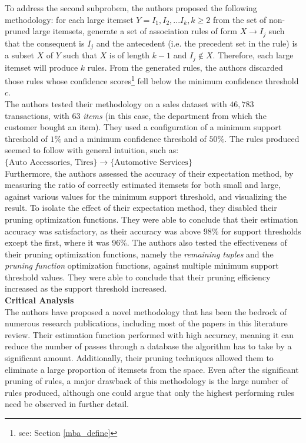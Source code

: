 \documentclass[paper=a4,fontsize=11pt]{report}	%
\begin{document}
To address the second subprobem,  the authors proposed the following methodology: for each large itemset $Y = I_1, I_2,...I_k, k\geq 2$ from the set of non-pruned large itemsets, generate a set of association rules of form $X \rightarrow I_j$ such that the consequent is $I_j$ and the antecedent (i.e. the precedent set in the rule) is a subset $X$ of $Y$ such that $X$ is of length $k-1$ and $I_j \notin X$. Therefore, each large itemset will produce $k$ rules. From the generated rules, the authors discarded those rules whose confidence scores\footnote{see: Section \ref{mba_define}} fell below the minimum confidence threshold $c$.\\
The authors tested their methodology on a sales dataset with $46,783$ transactions,  with $63$ \textit{items} (in this case, the department from which the customer bought an item). They used a configuration of a minimum support threshold of $1\%$ and a minimum confidence threshold of $50\%$. The rules produced seemed to follow with general intuition, such as:\\
$\{\text{Auto Accessories, Tires}\} \rightarrow \{\text{Automotive Services}\} $\\
Furthermore, the authors assessed the accuracy of their expectation method, by measuring the ratio of correctly estimated itemsets for both small and large, against various values for the minimum support threshold, and visualizing the result. To isolate the effect of their expectation method, they disabled their pruning optimization functions. They were able to conclude that their estimation accuracy was satisfactory, as their accuracy was above 98\% for support thresholds except the first, where it was 96\%.  The authors also tested the effectiveness of their pruning optimization functions, namely the \textit{remaining tuples} and the \textit{pruning function} optimization functions, against multiple minimum support threshold values. They were able to conclude that their pruning efficiency increased as the support threshold increased.
\\\textbf{Critical Analysis}\\
The authors have proposed a novel methodology that has been the bedrock of numerous research publications,  including most of the papers in this literature review.  Their estimation function performed with high accuracy, meaning it can reduce the number of passes through a database the algorithm has to take by a significant amount. Additionally, their pruning techniques allowed them to eliminate a large proportion of itemsets from the space. Even after the significant pruning of rules, a major drawback of this methodology is the large number of rules produced, although one could argue that only the highest performing rules need be observed in further detail.
\end{document}
